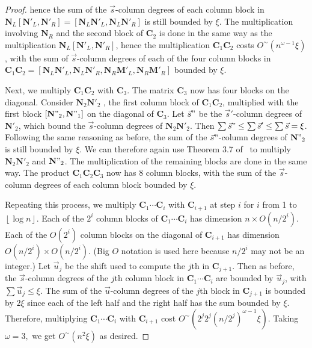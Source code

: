 \documentclass[a4paper,11pt]{article}
\begin{document}
\begin{proof}
hence the sum of the $\vec{s}$-column degrees of each column block
in $\mathbf{N}_{L}\left[\mathbf{N}'_{L},\mathbf{N}'_{R}\right]=\left[\mathbf{N}_{L}\mathbf{N}'_{L},\mathbf{N}_{L}\mathbf{N}'_{R}\right]$
is still bounded by $\xi$. The multiplication involving $\mathbf{N}_{R}$
and the second block of $\mathbf{C}_{2}$ is done in the same way
as the multiplication $\mathbf{N}_{L}\left[\mathbf{N}'_{L},\mathbf{N}'_{R}\right]$,
hence the multiplication $\mathbf{C}_{1}\mathbf{C}_{2}$ costs $O^{\sim}\left(n^{\omega-1}\xi\right)$,
with the sum of $\vec{s}$-column degrees of each of the four column
blocks in $\mathbf{C}_{1}\mathbf{C}_{2}=\left[\mathbf{N}_{L}\mathbf{N}'_{L},\mathbf{N}_{L}\mathbf{N}'_{R},\mathbf{N}_{R}\mathbf{M}'_{L},\mathbf{N}_{R}\mathbf{M}'_{R}\right]$
bounded by $\xi$.

Next, we multiply $\mathbf{C}_{1}\mathbf{C}_{2}$ with $\mathbf{C}_{3}$.
The matrix $\mathbf{C}_{3}$ now has four blocks on the diagonal.
Consider $\mathbf{N}_{2}\mathbf{N}'_{2}$ , the first column block
of $\mathbf{C}_{1}\mathbf{C}_{2}$, multiplied with the first block
$\left[\mathbf{N}"_{2},\mathbf{N}"_{1}\right]$ on the diagonal of
$\mathbf{C}_{3}$. Let $\vec{s}"$ be the $\vec{s}'$-column degrees
of $\mathbf{N}'_{2}$, which bound the $\vec{s}$-column degrees of
$\mathbf{N}_{2}\mathbf{N}'_{2}$. Then $\sum\vec{s}"\le\sum\vec{s}'\le\sum\vec{s}=\xi$.
Following the same reasoning as before, the sum of the $\vec{s}"$-column
degrees of $\mathbf{N}"_{2}$ is still bounded by $\xi$. We can therefore
again use Theorem 3.7 of~\cite{zhou-labahn-storjohann:12} to multiply
$\mathbf{N}_{2}\mathbf{N}'_{2}$ and $\mathbf{N}"_{2}$. The multiplication
of the remaining blocks are done in the same way. The product $\mathbf{C}_{1}\mathbf{C}_{2}\mathbf{C}_{3}$
now has 8 column blocks, with the sum of the $\vec{s}$-column degrees
of each column block bounded by $\xi$.

Repeating this process, we multiply $\mathbf{C}_{1}\cdots\mathbf{C}_{i}$
with $\mathbf{C}_{i+1}$ at step $i$ for $i$ from 1 to $\left\lfloor \log n\right\rfloor $.
Each of the $2^{i}$ column blocks of $\mathbf{C}_{1}\cdots\mathbf{C}_{i}$
has dimension $n\times O(n/2^{i})$. Each of the $O(2^{i})$ column
blocks on the diagonal of $\mathbf{C}_{i+1}$ has dimension $O(n/2^{i})\times O(n/2^{i})$.
(Big $O$ notation is used here because $n/2^{i}$ may not be an integer.)
Let $\vec{u}_{j}$ be the shift used to compute the $j$th in $\mathbf{C}_{j+1}$. Then as before, the $\vec{s}$-column degrees of the $j$th column
block in $\mathbf{C}_{1}\cdots\mathbf{C}_{i}$ are bounded by $\vec{u}_{j}$,
with $\sum\vec{u}_{j}\le\xi$. The sum of the $\vec{u}$-column degrees
of the $j$th block in $\mathbf{C}_{j+1}$ is bounded by $2\xi$ since each of the left half and the right half has the sum bounded by $\xi$.
Therefore, multiplying $\mathbf{C}_{1}\cdots\mathbf{C}_{i}$ with
$\mathbf{C}_{i+1}$ cost $O^{\sim}\left(2^{j}2^{j}\left(n/2^{j}\right)^{\omega-1}\xi\right)$.
Taking $\omega=3,$ we get $O^{\sim}\left(n^{2}\xi\right)$ as desired.
\end{proof}
\end{document}
